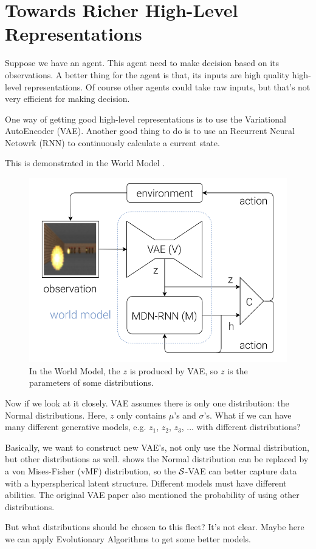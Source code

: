 \newcommand\pagetitle{Additional Thoughts}

\usepackage{enumerate}
\usepackage{float}



\section*{Towards Richer High-Level Representations}

Suppose we have an agent.
This agent need to make decision based on its observations.
A better thing for the agent is that, its inputs are high quality high-level representations.
Of course other agents could take raw inputs, but that's not very efficient for making decision.

One way of getting good high-level representations is to use the Variational AutoEncoder (VAE).
Another good thing to do is to use an Recurrent Neural Netowrk (RNN) to continuously calculate a current state.

This is demonstrated in the World Model \cite{ha_world_2018}.

\begin{figure}[h]
    \centering
    \includegraphics[width=.5\textwidth]{./world_model.png}
    \caption{In the World Model, the $z$ is produced by VAE, so $z$ is the parameters of some distributions.}
\end{figure}

Now if we look at it closely.
VAE assumes there is only one distribution: the Normal distributions.
Here, $z$ only contains $\mu$'s and $\sigma$'s.
What if we can have many different generative models, e.g. $z_1$, $z_2$, $z_3$, ... with different distributions?

Basically, we want to construct new VAE's, not only use the Normal distribution, but other distributions as well.
\cite{davidson_hyperspherical_2018} shows the Normal distribution can be replaced by a von Mises-Fisher (vMF) distribution, so the $\cal{S}$-VAE can better capture data with a hyperspherical latent structure.
Different models must have different abilities.
The original VAE paper \cite{kingma_auto-encoding_2014} also mentioned the probability of using other distributions.

But what distributions should be chosen to this fleet? It's not clear.
Maybe here we can apply Evolutionary Algorithms to get some better models.






